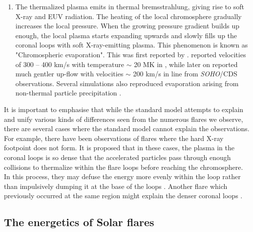 \begin{enumerate}
    \item  The thermalized plasma emits in thermal bremsstrahlung, giving rise to soft X-ray and EUV radiation. The heating of the local chromosphere gradually increases the local pressure. When the growing pressure gradient builds up enough, the local plasma starts expanding upwards and slowly fills up the coronal loops with soft X-ray-emitting plasma. This phenomenon is known as "Chromospheric evaporation". This was first reported by \cite{doscheck80,feldman80}. \cite{antonucci89} reported velocities of 300 {--} 400 km/s with temperature $\sim$ 20 MK in , while later on \cite{milligan06} reported much gentler up-flow with velocities $\sim$ 200 km/s in  line from {\it SOHO}/CDS observations. Several simulations also reproduced evaporation arising from non-thermal particle precipitation \citep{sterling93,hori98,reeves07}.
\end{enumerate}

It is important to emphasise that while the standard model attempts to explain and unify various kinds of differences seen from the numerous flares we observe, there are several cases where the standard model cannot explain the observations. For example, there have been observations of flares where the hard X-ray footpoint does not form. It is proposed that in these cases, the plasma in the coronal loops is so dense that the accelerated particles pass through enough collisions to thermalize within the flare loops before reaching the chromosphere. In this process, they may defuse the energy more evenly within the loop rather than impulsively dumping it at the base of the loops \citep{veronig02,veronig04}. Another flare which previously occurred at the same region might explain the denser coronal loops \citep{strong84,bone07}.  

\subsection{The energetics of Solar flares}\label{sol_flr_energ}

